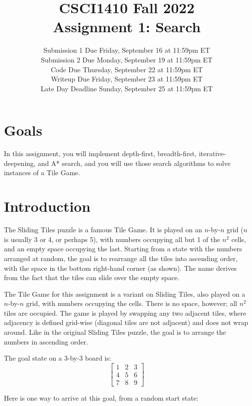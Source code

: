 \documentclass{article}
\title{CSCI1410 Fall 2022 \\
Assignment 1: Search}
\author{}
\date{%
Submission 1 Due Friday, September 16 at 11:59pm ET\\ [1ex]
Submission 2 Due Monday, September 19 at 11:59pm ET\\ [1ex]
Code Due Thursday, September 22 at 11:59pm ET\\ [1ex]
Writeup Due Friday, September 23 at 11:59pm ET\\ [1ex]
Late Day Deadline Sunday, September 25 at 11:59pm ET
}
\begin{document}
\maketitle


\section{Goals}

In this assignment, you will implement depth-first, breadth-first,
iterative-deepening, and A* search, and you will use those search algorithms to
solve instances of a Tile Game.


\section{Introduction}

The Sliding Tiles puzzle is a famous Tile Game.
It is played on an $n$-by-$n$ grid ($n$ is usually 3 or 4, or perhaps 5),
with numbers occupying all but 1 of the $n^2$ cells,
and an empty space occupying the last.
Starting from a state with the numbers arranged at random,
the goal is to rearrange all the tiles into ascending order,
with the space in the bottom right-hand corner (as shown).
The name derives from the fact that the tiles can slide over the empty space.

The Tile Game for this assignment is a variant on Sliding Tiles,
also played on a $n$-by-$n$ grid, with numbers occupying the cells.
There is no space, however; all $n^2$ tiles are occupied.
The game is played by swapping any two adjacent tiles,
where adjacency is defined grid-wise (diagonal tiles are not adjacent) and does not wrap around.
Like in the original Sliding Tiles puzzle,
the goal is to arrange the numbers in ascending order.

The goal state on a 3-by-3 board is:
\[
\begin{bmatrix}
1 & 2 & 3 \\
4 & 5 & 6 \\
7 & 8 & 9
\end{bmatrix}
\]

Here is one way to arrive at this goal, from a random start state:
\end{document}
